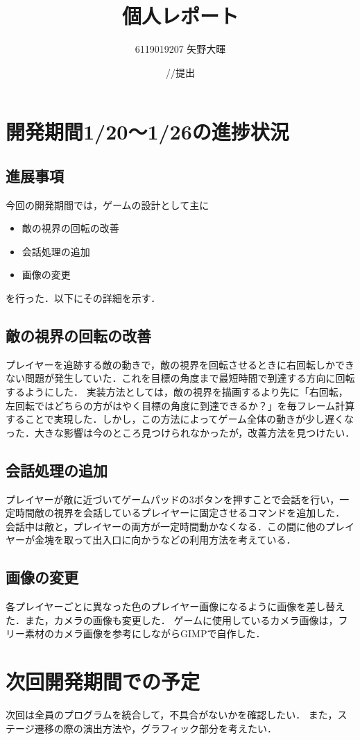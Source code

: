 \documentclass{jarticle}
\title{個人レポート}
\author{6119019207 矢野大暉}
\date{\number\year/\number\month/\number\day 提出}
\newcommand{\xd}{敵の視界の回転の改善}
\newcommand{\xg}{会話処理の追加}
\newcommand{\xh}{画像の変更}
\newcommand{\pitem}[3]{
\item #1
\item #2
\item #3
}
\begin{document}
\maketitle

\section{開発期間1/20～1/26の進捗状況} 

\subsection{進展事項}
今回の開発期間では，ゲームの設計として主に
\begin{itemize}
\pitem{\xd}{\xg}{\xh}
\end{itemize}
を行った．以下にその詳細を示す．

\subsection{\xd}
プレイヤーを追跡する敵の動きで，敵の視界を回転させるときに右回転しかできない問題が発生していた．これを目標の角度まで最短時間で到達する方向に回転するようにした．
実装方法としては，敵の視界を描画するより先に「右回転，左回転ではどちらの方がはやく目標の角度に到達できるか？」を毎フレーム計算することで実現した．しかし，この方法によってゲーム全体の動きが少し遅くなった．大きな影響は今のところ見つけられなかったが，改善方法を見つけたい．

\subsection{\xg}
プレイヤーが敵に近づいてゲームパッドの3ボタンを押すことで会話を行い，一定時間敵の視界を会話しているプレイヤーに固定させるコマンドを追加した．
会話中は敵と，プレイヤーの両方が一定時間動かなくなる．この間に他のプレイヤーが金塊を取って出入口に向かうなどの利用方法を考えている．

\subsection{\xh}
各プレイヤーごとに異なった色のプレイヤー画像になるように画像を差し替えた．また，カメラの画像も変更した．
ゲームに使用しているカメラ画像は，フリー素材のカメラ画像を参考にしながらGIMPで自作した．

\section{次回開発期間での予定}
次回は全員のプログラムを統合して，不具合がないかを確認したい．
また，ステージ遷移の際の演出方法や，グラフィック部分を考えたい．
\end{document}
